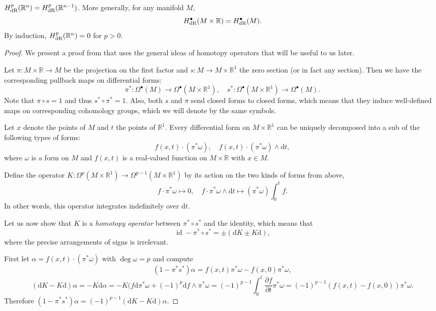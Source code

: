 \documentclass[english,letterpaper]{article}%
\numberwithin{equation}{section}
\numberwithin{figure}{section}
\numberwithin{table}{section}
\theoremstyle{definition}
\theoremstyle{definition}
\theoremstyle{definition}
\theoremstyle{plain}
\theoremstyle{plain}
\theoremstyle{plain}
\theoremstyle{plain}
\theoremstyle{remark}
\theoremstyle{remark}
\newcommand{\bbR}{\mathbb{R}}
\newcommand{\dd}{{\mathrm{d}}}
\DeclareMathOperator{\id}{id}
\begin{document}
\begin{thm}\label{Poincare lem}
    $H^p_{\rm dR}(\mathbb{R}^{n})=H^{p}_{\rm dR}(\mathbb{R}^{n-1})$. More generally, for any manifold $M$,
    \[H^\bullet_{\rm dR}(M\times\bbR)=H^{\bullet}_{\rm dR}(M).\]
    By induction, $H^p_{\rm dR}(\mathbb{R}^{n})=0$ for $p>0$.
\end{thm}
\begin{proof}
    We present a proof from \cite{BottTu} that uses the general ideas of homotopy operators that will be useful to us later.
    
    Let $\pi:M\times\mathbb{R}\to M$ be the projection on the first factor and $s:M\to M\times\mathbb{R}^1$ the zero section (or in fact any section). Then we have the corresponding pullback maps on differential forms:
    \[\pi^\ast:\Omega^\bullet(M)\to \Omega^\bullet(M\times\bbR^1),\quad s^\ast: \Omega^\bullet(M\times\bbR^1)\to \Omega^\bullet(M).\]
    Note that $\pi\circ s=1$ and thus $s^\ast\circ\pi^\ast=1$. Also, both $s$ and $\pi$ send closed forms to closed forms, which means that they induce well-defined maps on corresponding cohomology groups, which we will denote by the same symbols.
    
    Let $x$ denote the points of $M$ and $t$ the points of $\bbR^1$. Every differential form on $M\times\bbR^1$ can be uniquely decomposed into a sub of the following types of forms:
    \[f(x,t)\cdot (\pi^\ast\omega),\quad f(x,t)\cdot(\pi^\ast\omega)\wedge\dd t,\]
    where $\omega$ is a form on $M$ and $f(x,t)$ is a real-valued function on $M\times\bbR$ with $x\in M$.
    
    Define the operator $K:\Omega^p(M\times\bbR^1)\to \Omega^{p-1}(M\times\bbR^1)$ by its action on the two kinds of forms from above,
    \[f\cdot \pi^\ast \omega\mapsto 0,\quad f\cdot\pi^\ast \omega \wedge\dd t\mapsto (\pi^\ast\omega)\int_0^t f.\]
    In other words, this operator integrates indefinitely over $\dd t$.
    
    Let us now show that $K$ is a \emph{homotopy operator} between $\pi^\ast\circ s^\ast$ and the identity, which means that
    \[\id-\pi^\ast\circ s^\ast=\pm (\dd K\pm K \dd),\]
    where the precise arrangements of signs is irrelevant.
    
    First let $\alpha=f(x,t)\cdot (\pi^\ast\omega)$ with $\deg \omega=p$ and compute
    \[(1-\pi^\ast s^\ast)\alpha=f(x,t)\pi^\ast\omega-f(x,0)\pi^\ast\omega,\]
    \[(\dd K-K \dd)\alpha=-K\dd\alpha=-K(f\dd\pi^\ast\omega+(-1)^p\dd f\wedge\pi^\ast\omega=(-1)^{p-1}\int_0^t\frac{\partial f}{\partial t}\pi^\ast\omega=(-1)^{p-1}(f(x,t)-f(x,0))\pi^\ast\omega.\]
    Therefore $(1-\pi^\ast s^\ast)\alpha=(-1)^{p-1}(\dd K-K \dd)\alpha$.
    

\end{proof}
\end{document}
